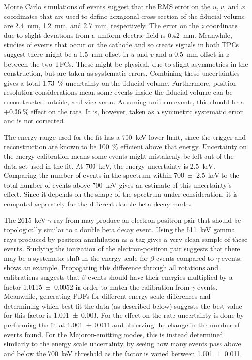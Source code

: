 \documentclass[herrin-thesis.tex]{subfiles}
\begin{document}
Monte Carlo simulations of \twonu{} events suggest that the RMS error on the \(u\), \(v\), and \(x\) coordinates that are used to define hexagonal cross-section of the fiducial volume are \SI{2.4}{\mm}, \SI{1.2}{\mm}, and \SI{2.7}{\mm}, respectively. The error on the \(z\) coordinate due to slight deviations from a uniform electric field is \SI{0.42}{\mm}. Meanwhile, studies of events that occur on the cathode and so create signals in both TPCs suggest there might be a \SI{1.5}{\mm} offset in \(u\) and \(v\) and a \SI{0.5}{\mm} offset in \(z\) between the two TPCs. These might be physical, due to slight asymmetries in the construction, but are taken as systematic errors. Combining these uncertainties gives a total \SI{1.73}{\percent} uncertainty on the fiducial volume. Furthermore, position resolution considerations mean some events inside the fiducial volume can be reconstructed outside, and vice versa. Assuming uniform events, this should be a \(+\SI{0.36}{\percent}\) effect on the rate. It is, however, taken as a symmetric systematic error and is not corrected.

The energy range used for the fit has a \SI{700}{\keV} lower limit, since the trigger and reconstruction are known to be \SI{100}{\percent} efficient above that energy. Uncertainty on the energy calibration means some events might mistakenly be left out of the data set used in the fit. At \SI{700}{\keV}, the energy uncertainty is \SI{2.5}{\keV}. Comparing the number of events in the spectrum within \SI{700\pm2.5}{\keV} to the total number of events above \SI{700}{\keV} gives an estimate of this uncertainty's effect. Since it depends on the shape of the spectrum under consideration, it is computed separately for the different double beta decay modes.

The \SI{2615}{\keV} \(\gamma\) ray from  may produce an electron-positron pair that should be topologically similar to a double beta decay event. Using the \SI{511}{\keV} gamma rays produced by positron annihilation as a tag gives a very clean sample of these events. Studying the ionization of the electron-positron pair suggests that there may be a systematic shift in the energy scale for \(\beta\) events compared to \(\gamma\) events.  shows an example. Propagating this difference through all rotations and calibrations suggests that \(\beta\) events should have their energies multiplied by a factor \num{1.0115\pm0.0052} in order to match the calibration from \(\gamma\) events. Meanwhile, generating PDFs for different energy scale differences and determining which best fit the data (as described below) suggests the best value for this factor is \num{1.001\pm0.003}. For \twonu{} the effect on the rate uncertainty is done by performing the fit at \num{1.001\pm0.011} and observing the change in the number of events found. For the Majoron-emitting modes, this is instead determined similarly to the energy scale uncertainty, by seeing how many events pass above and below the \SI{700}{\keV} threshold as the factor is varied between \num{1.001\pm0.011}.
\end{document}
